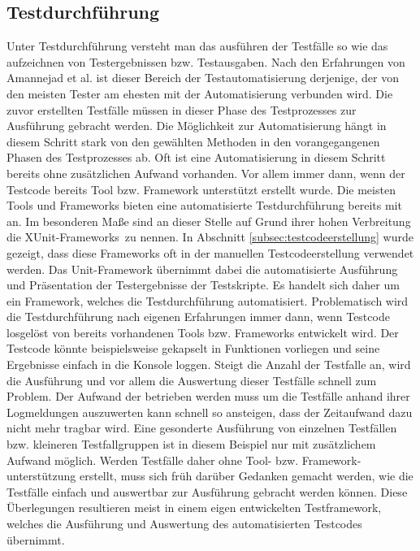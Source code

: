 \subsection{Testdurchführung}
\label{subsec:testdurchführung}
Unter Testdurchführung versteht man das ausführen der Testfälle so wie das aufzeichnen von Testergebnissen bzw. Testausgaben. Nach den Erfahrungen von Amannejad et al. \cite{amannejad_search-based_2014} ist dieser Bereich der Testautomatisierung derjenige, der von den meisten Tester am ehesten mit der Automatisierung verbunden wird.
Die zuvor erstellten Testfälle müssen in dieser Phase des Testprozesses zur Ausführung gebracht werden. Die Möglichkeit zur Automatisierung hängt in diesem Schritt stark von den gewählten Methoden in den vorangegangenen Phasen des Testprozesses ab. Oft ist eine Automatisierung in diesem Schritt bereits ohne zusätzlichen Aufwand vorhanden. Vor allem immer dann, wenn der Testcode bereits Tool bzw. Framework unterstützt erstellt wurde.
Die meisten Tools und Frameworks bieten eine automatisierte Testdurchführung bereits mit an.
Im besonderen Maße sind an dieser Stelle auf Grund ihrer hohen Verbreitung die \grq XUnit-Frameworks\grq\ zu nennen.
In Abschnitt \ref{subsec:testcodeerstellung} wurde gezeigt, dass diese Frameworks oft in der manuellen Testcodeerstellung verwendet werden. Das Unit-Framework übernimmt dabei die automatisierte Ausführung und Präsentation der Testergebnisse der Testskripte. Es handelt sich daher um ein Framework, welches die Testdurchführung automatisiert.
Problematisch wird die Testdurchführung nach eigenen Erfahrungen immer dann, wenn Testcode losgelöst von bereits vorhandenen Tools bzw. Frameworks entwickelt wird. Der Testcode könnte beispielsweise gekapselt in Funktionen vorliegen und seine Ergebnisse einfach in die Konsole loggen. Steigt die Anzahl der Testfalle an, wird die Ausführung und vor allem die Auswertung dieser Testfälle schnell zum Problem. Der Aufwand der betrieben werden muss um die Testfälle anhand ihrer Logmeldungen auszuwerten kann schnell so ansteigen, dass der Zeitaufwand dazu nicht mehr tragbar wird. 
Eine gesonderte Ausführung von einzelnen Testfällen bzw. kleineren Testfallgruppen ist in diesem Beispiel nur mit zusätzlichem Aufwand möglich.
Werden Testfälle daher ohne Tool- bzw. Framework-unterstützung erstellt, muss sich früh darüber Gedanken gemacht werden, wie die Testfälle einfach und auswertbar zur Ausführung gebracht werden können.
Diese Überlegungen resultieren meist in einem eigen entwickelten Testframework, welches die Ausführung und Auswertung des automatisierten Testcodes übernimmt.


